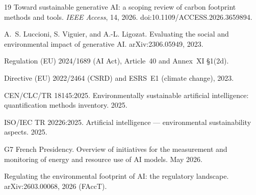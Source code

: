 \documentclass[10pt]{article}
\begin{document}
\begin{thebibliography}{19}
 Toward sustainable generative AI: a scoping review of
carbon footprint methods and tools. \emph{IEEE Access}, 14, 2026.
doi:10.1109/ACCESS.2026.3659894.

 A.~S. Luccioni, S. Viguier, and A.-L. Ligozat. Evaluating
the social and environmental impact of generative AI. arXiv:2306.05949,
2023.

 Regulation (EU) 2024/1689 (AI Act), Article~40 and
Annex~XI \S1(2d).

 Directive (EU) 2022/2464 (CSRD) and ESRS~E1 (climate change),
2023.

 CEN/CLC/TR 18145:2025. Environmentally sustainable
artificial intelligence: quantification methods inventory. 2025.

 ISO/IEC TR 20226:2025. Artificial intelligence ---
environmental sustainability aspects. 2025.

 G7 French Presidency. Overview of initiatives for the
measurement and monitoring of energy and resource use of AI models. May
2026.

 Regulating the environmental footprint of AI: the
regulatory landscape. arXiv:2603.00068, 2026 (FAccT).

\end{thebibliography}
\end{document}
